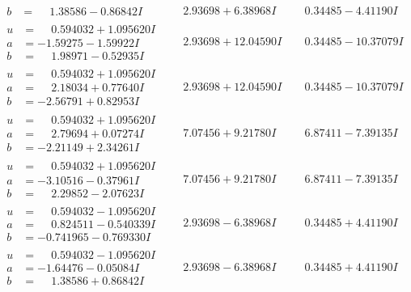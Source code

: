 \documentclass[1p]{elsarticle_modified}
\theoremstyle{definition}
\begin{document}
$$\begin{array}{c|c|c}
\begin{aligned}
b &= \phantom{-}1.38586 - 0.86842 I\end{aligned}
 & \phantom{-}2.93698 + 6.38968 I & \phantom{-}0.34485 - 4.41190 I \\ \hline\begin{aligned}
u &= \phantom{-}0.594032 + 1.095620 I \\
a &= -1.59275 - 1.59922 I \\
b &= \phantom{-}1.98971 - 0.52935 I\end{aligned}
 & \phantom{-}2.93698 + 12.04590 I & \phantom{-}0.34485 - 10.37079 I \\ \hline\begin{aligned}
u &= \phantom{-}0.594032 + 1.095620 I \\
a &= \phantom{-}2.18034 + 0.77640 I \\
b &= -2.56791 + 0.82953 I\end{aligned}
 & \phantom{-}2.93698 + 12.04590 I & \phantom{-}0.34485 - 10.37079 I \\ \hline\begin{aligned}
u &= \phantom{-}0.594032 + 1.095620 I \\
a &= \phantom{-}2.79694 + 0.07274 I \\
b &= -2.21149 + 2.34261 I\end{aligned}
 & \phantom{-}7.07456 + 9.21780 I & \phantom{-}6.87411 - 7.39135 I \\ \hline\begin{aligned}
u &= \phantom{-}0.594032 + 1.095620 I \\
a &= -3.10516 - 0.37961 I \\
b &= \phantom{-}2.29852 - 2.07623 I\end{aligned}
 & \phantom{-}7.07456 + 9.21780 I & \phantom{-}6.87411 - 7.39135 I \\ \hline\begin{aligned}
u &= \phantom{-}0.594032 - 1.095620 I \\
a &= \phantom{-}0.824511 - 0.540339 I \\
b &= -0.741965 - 0.769330 I\end{aligned}
 & \phantom{-}2.93698 - 6.38968 I & \phantom{-}0.34485 + 4.41190 I \\ \hline\begin{aligned}
u &= \phantom{-}0.594032 - 1.095620 I \\
a &= -1.64476 - 0.05084 I \\
b &= \phantom{-}1.38586 + 0.86842 I\end{aligned}
 & \phantom{-}2.93698 - 6.38968 I & \phantom{-}0.34485 + 4.41190 I\\

\end{array}$$
\end{document}
